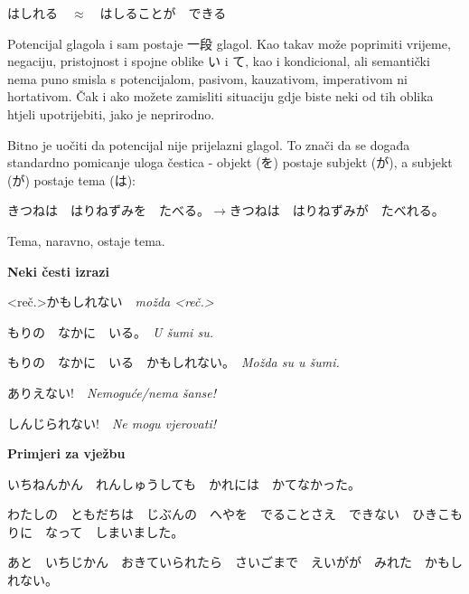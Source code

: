 \documentclass[12pt]{article}
\begin{document}
	はしれる　$\approx$　はしることが　できる
	
	Potencijal glagola i sam postaje 一段 glagol. Kao takav može poprimiti vrijeme, negaciju, pristojnost i spojne oblike い i て, kao i kondicional, ali semantički nema puno smisla s potencijalom, pasivom, kauzativom, imperativom ni hortativom. Čak i ako možete zamisliti situaciju gdje biste neki od tih oblika htjeli upotrijebiti, jako je neprirodno.
	
	Bitno je uočiti da potencijal nije prijelazni glagol. To znači da se događa standardno pomicanje uloga čestica - objekt (を) postaje subjekt (が), a subjekt (が) postaje tema (は):
	
	きつねは　はりねずみを　たべる。$\rightarrow$きつねは　はりねずみが　たべれる。
	
	Tema, naravno, ostaje tema.
	
	\vspace{20pt}
	\normalsize \textbf{Neki česti izrazi}
	\vspace{20pt}
	
	<reč.>かもしれない　\textit{možda <reč.>}
	
	もりの　なかに　いる。　\textit{U šumi su.}
	
	もりの　なかに　いる　かもしれない。　\textit{Možda su u šumi.}
	\vspace{10pt}
	
	ありえない!　\textit{Nemoguće/nema šanse!}
	\vspace{10pt}
	
	しんじられない!　\textit{Ne mogu vjerovati!}
	
	\vspace{20pt}
	\normalsize \textbf{Primjeri za vježbu}
	\vspace{20pt}
	
	いちねんかん　れんしゅうしても　かれには　かてなかった。
	
	わたしの　ともだちは　じぶんの　へやを　でることさえ　できない　ひきこもりに　なって　しまいました。
	
	あと　いちじかん　おきていられたら　さいごまで　えいがが　みれた　かもしれない。
	
	
\end{document}
